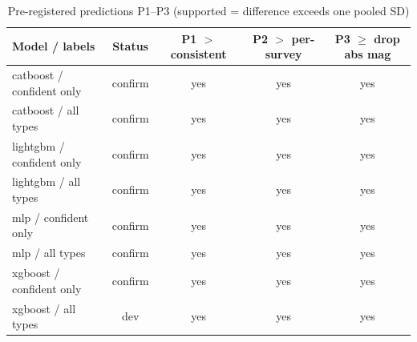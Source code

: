 \begin{table}
\centering
\caption{Pre-registered predictions P1–P3 (supported = difference exceeds one pooled SD)}
\begin{tabular}{lcccc}
\hline
Model / labels & Status & P1 $>$ consistent & P2 $>$ per-survey & P3 $\geq$ drop abs mag \\
\hline
catboost / confident only & confirm & yes & yes & yes \\
catboost / all types & confirm & yes & yes & yes \\
lightgbm / confident only & confirm & yes & yes & yes \\
lightgbm / all types & confirm & yes & yes & yes \\
mlp / confident only & confirm & yes & yes & yes \\
mlp / all types & confirm & yes & yes & yes \\
xgboost / confident only & confirm & yes & yes & yes \\
xgboost / all types & dev & yes & yes & yes \\
\hline
\end{tabular}
\end{table}
